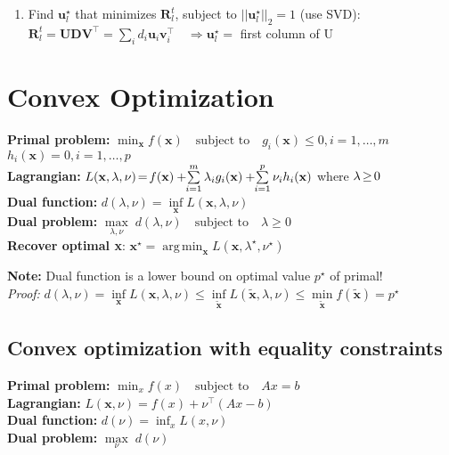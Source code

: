\documentclass[a4paper,11pt]{article}
\newcommand{\argmin}{\operatorname*{arg\,min}}
\newcommand{\msection}[1]{\section{#1}\vspace{-0.5mm}}
\begin{document}
\begin{multicols}{2}
\begin{enumerate}[leftmargin=0.4cm]
\begin{enumerate}[leftmargin=0.5cm]
  \item Find $\mathbf u_l^\star$ that minimizes $\mathbf R_l^t$, subject to $||\mathbf u_l^\star||_2 = 1$ (use SVD):\\
  $\mathbf R_l^t = \mathbf U \mathbf D \mathbf V^\top = \sum_i d_i \mathbf u_i \mathbf v_i^\top \quad \Rightarrow \mathbf{u}_l^\star = $ first column of U 
 \end{enumerate}
\end{enumerate}
\vspace{0.1cm}
\msection{Convex Optimization}
\textbf{Primal problem:} 
$ \min_{\textbf{x}} f(\mathbf{x}) \quad \text{subject to} \quad g_i(\mathbf{x}) \leq 0, i = 1, \ldots, m$\\
\hspace{6.6cm} $h_i(\mathbf{x}) = 0, i = 1, \ldots, p$\\
\textbf{Lagrangian:} 
$L(\mathbf{x}, \lambda, \nu) \hspace{-0.05cm} = \hspace{-0.05cm} f(\mathbf{x}) + \hspace{-0.1cm} \sum\limits_{i=1}^m \lambda_i g_i(\mathbf{x}) + \hspace{-0.1cm} \sum\limits_{i=1}^p \nu_i h_i(\mathbf{x})$ where $\lambda \hspace{-0.05cm} \geq \hspace{-0.05cm} 0$\\
\textbf{Dual function:}
$d(\lambda, \nu) = \inf\limits_\textbf{x} L(\mathbf{x}, \lambda, \nu)$\\
\textbf{Dual problem:}
$\max\limits_{\lambda, \nu} \; d(\lambda, \nu) \quad \text{subject to} \quad \lambda \geq 0$\\
\textbf{Recover optimal \textbf{x}}: $\textbf{x}^\star = \argmin_\mathbf{x} L(\textbf{x}, \lambda^\star, \nu^\star)$

\textbf{Note:} Dual function is a lower bound on optimal value $p^\star$ of primal!\\
\emph{Proof:} $d(\lambda, \nu) = \inf\limits_{\mathbf{x}} L(\mathbf{x}, \lambda, \nu) \leq  
\inf\limits_{\tilde{\mathbf{x}}} L(\tilde{\mathbf{x}}, \lambda, \nu) \leq
\min\limits_{\tilde{\mathbf{x}}} f(\mathbf{\tilde{x}}) = p^\star$


\subsection{Convex optimization with equality constraints}
\textbf{Primal problem:} $\min_{x} f(x) \quad \text{subject to} \quad Ax = b$\\
\textbf{Lagrangian:} $L(\mathbf{x}, \nu) = f(x) + \nu^\top(A x - b)$\\
\textbf{Dual function:} $d(\nu) = \inf_x L(x, \nu)$\\
\textbf{Dual problem:} $\max\limits_{\nu} \; d(\nu)$\\


\end{multicols}
\end{document}
